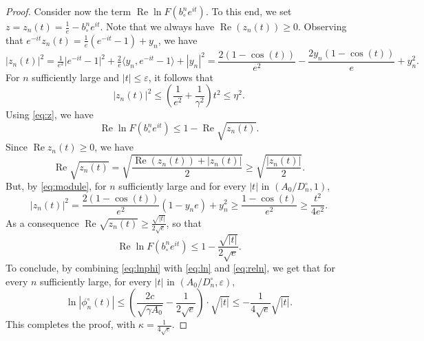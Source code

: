 \documentclass[10pt]{amsart}
\theoremstyle{definition}\newtheorem{defi}[theo]{Definition}\newtheorem{rema}[theo]{Remark}\newtheorem{exam}[theo]{Example}\newtheorem{exem}[theo]{Example}\newtheorem{nota}[theo]{Notation}
\renewcommand{\Re}{\operatorname{Re}}
\def\bcn{b_{\circ}^{n}}
\def\phicn{\phi^{\circ}_{n}}
\def\Dcn{D^{\circ}_{n}}
\renewcommand{\epsilon}{\varepsilon}
\begin{document}
\begin{proof}
Consider now the term $\Re \ln F( \bcn e^{it})$.
To this end, we set $z=z_{n}(t)=\tfrac{1}{e}-\bcn e^{it}$.
Note that we always have $\Re(z_n(t)) \ge 0$.
Observing that $e^{-it} z_{n}(t)= \tfrac{1}{e}(e^{-it}-1)+y_n$, we have
\begin{equation}
  \label{eq:module} |z_{n}(t)|^{2}=  \tfrac{1}{e^2} \big|e^{-it}-1\big|^2
  +\tfrac{2}{e} \big\langle y_n, e^{-it}-1 \big\rangle +|y_n|^2
  = \frac{2(1-\cos(t))}{e^{2}} -\frac{2 y_{n}(1-\cos(t))}{e}+y_{n}^{2}.
\end{equation}
For $n$ sufficiently large and $|t| \leq \epsilon$, it follows that
\begin{equation}
\label{ineq:module} |z_{n}(t)|^{2} \leq  \left( \frac{1}{e^{2}} + \frac{1}{\gamma^{2}} \right)  t^{2} \leq \eta^{2}.
\end{equation}
Using \eqref{eq:z}, we have
\[\Re \ln F( \bcn e^{it}) \leq 1-   \Re \sqrt{z_{n}(t)}.\]
Since $\Re z_{n}(t) \ge 0$, we have
\[ \Re \sqrt{z_{n}(t)}=\sqrt{\frac{\Re(z_n(t))+|z_n(t)|}{2}} \ge \sqrt{\frac{|z_n(t)|}{2}}. \]
But, by \eqref{eq:module}, for $n$ sufficiently large and  for every $|t|$ in $(A_{0}/\Dcn,1)$,
\[|z_{n}(t)|^{2} = \frac{2(1-\cos(t))}{e^{2}} (1-y_{n} e)+y_{n}^{2} \geq \frac{1-\cos(t)}{e^{2}} \geq  \frac{t^{2}}{4e^{2}}.\]
As a consequence $\Re \sqrt{z_{n}(t)} \geq \frac{\sqrt{|t|}}{2\sqrt{e}}$, so that
\begin{equation}
\label{eq:reln}\Re \ln F( \bcn e^{it}) \leq 1- \frac{\sqrt{|t|}}{2\sqrt{e}}.
\end{equation}
To conclude, by combining \eqref{eq:lnphi} with \eqref{eq:ln} and \eqref{eq:reln},
we get that for every $n$ sufficiently large, for every $|t|$ in $(A_{0}/\Dcn, \epsilon)$,
\[\ln|\phicn(t)| \leq \left(  \frac{2c}{\sqrt{\gamma A_{0}}}- \frac{1}{2\sqrt{e}} \right) \cdot \sqrt{|t|} \leq -\frac{1}{4\sqrt{e}} \sqrt{|t|}.\]
This completes the proof, with $\kappa= \frac{1}{4\sqrt{e}}$.
\end{proof}
\end{document}
